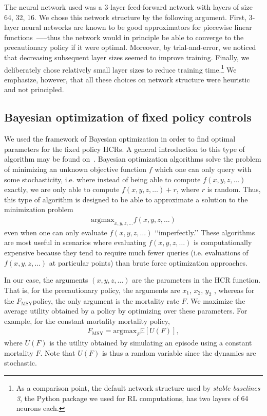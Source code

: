 \documentclass[floatfix,nofootinbib,longbibliography,notitlepage]{revtex4-2}
\def\textfmsy{$F_{\text{MSY}}$}
\def\fmsy{F_{\text{MSY}}}
\begin{document}
The neural network used was a 3-layer feed-forward network with layers of size 64, 32, 16. 
We chose this network structure by the following argument. 
First, 3-layer neural networks are known to be good approximators for piecewise linear functions~\cite{liang2016deep}—--thus the network would in principle be able to converge to the precautionary policy if it were optimal. 
Moreover, by trial-and-error, we noticed that decreasing subsequent layer sizes seemed to improve training. 
Finally, we deliberately chose relatively small layer sizes to reduce training time.\footnote{
As a comparison point, the default network structure used by \emph{stable baselines 3}, the Python package we used for RL computations, has two layers of 64 neurons each.
}
We emphasize, however, that all these choices on network structure were heuristic and not principled.

\subsection{Bayesian optimization of fixed policy controls}

We used the framework of Bayesian optimization in order to find optimal parameters for the fixed policy HCRs. 
A general introduction to this type of algorithm may be found on~\cite{frazier2018bayesian,head-skopt}. 
Bayesian optimization algorithms solve the problem of minimizing an unknown objective function $f$ which one can only query with some stochasticity, i.e. where instead of being able to compute $f(x, y, z, \dots)$ exactly, we are only able to compute $f(x, y, z, \dots)+r$, where $r$ is random. 
Thus, this type of algorithm is designed to be able to approximate a solution to the minimization problem
\begin{align}
    \mathrm{argmax}_{x,y,z,\dots} f(x,y,z,\dots)
\end{align}
even when one can only evaluate $f(x, y, z, \dots)$ ‘‘imperfectly.’’ 
These algorithms are most useful in scenarios where evaluating $f(x, y, z, \dots)$ is computationally expensive because they tend to require much fewer queries (i.e. evaluations of $f(x, y, z, \dots)$ at particular points) than brute force optimization approaches.

In our case, the arguments $(x, y, z, \dots)$ are the parameters in the HCR function. 
That is, for the precautionary policy, the arguments are $x_1$, $x_2$, $y_2$ , whereas for the \textfmsy policy, the only argument is the mortality rate $F$. 
We maximize the average utility obtained by a policy by optimizing over these parameters. 
For example, for the constant mortality mortality policy,
\begin{align}
    \fmsy = \mathrm{argmax}_F \mathbb{E}[U(F)],
\end{align}
where $U(F)$ is the utility obtained by simulating an episode using a constant mortality $F$. 
Note that $U(F)$ is thus a random variable since the dynamics are stochastic.
\end{document}
